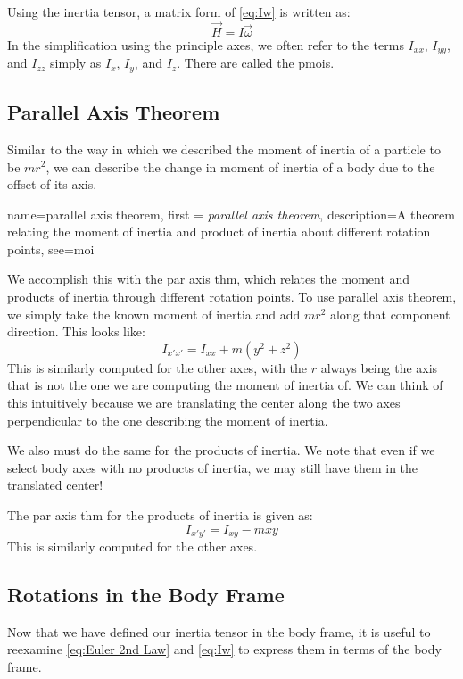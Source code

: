\documentclass[12pt]{report}
\begin{document}
Using the inertia tensor, a matrix form of \eqref{eq:Iw}  is written as:
\begin{equation}\label{eq:IwVec}
    \vec{H}=I\vec{\omega}
\end{equation}
In the simplification using the principle axes, we often refer to the terms $I_{xx}$, $I_{yy}$, and $I_{zz}$ simply as $I_x$, $I_y$, and $I_z$. There are called the \glspl{pmoi}.

\subsection{Parallel Axis Theorem}
Similar to the way in which we described the moment of inertia of a particle to be $mr^2$, we can describe the change in moment of inertia of a body due to the offset of its axis.

{
    name=parallel axis theorem,
    first = {\textit{parallel axis theorem}},
    description={A theorem relating the moment of inertia and product of inertia about different rotation points},
    see={moi}
}

We accomplish this with the \gls{par axis thm}, which relates the moment and products of inertia through different rotation points. To use parallel axis theorem, we simply take the known moment of inertia and add $mr^2$ along that component direction. This looks like:
$$I_{x'x'}=I_{xx}+m\left(y^2+z^2\right)$$
This is similarly computed for the other axes, with the $r$ always being the axis that is not the one we are computing the moment of inertia of. We can think of this intuitively because we are translating the center along the two axes perpendicular to the one describing the moment of inertia.

We also must do the same for the products of inertia. We note that even if we select body axes with no products of inertia, we may still have them in the translated center!

The \gls{par axis thm} for the products of inertia is given as:
$$I_{x'y'}=I_{xy}-mxy$$
This is similarly computed for the other axes.
\subsection{Rotations in the Body Frame}\label{sec:rotations in the body frame}
Now that we have defined our inertia tensor in the body frame, it is useful to reexamine \eqref{eq:Euler 2nd Law} and \eqref{eq:Iw} to express them in terms of the body frame.
\end{document}
